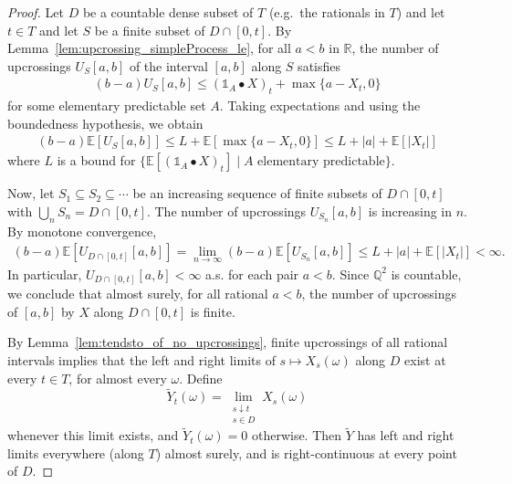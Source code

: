 \begin{proof}
  Let $D$ be a countable dense subset of $T$ (e.g.\ the rationals in $T$) and let $t \in T$ and let
  $S$ be a finite subset of $D \cap [0, t]$. By Lemma~\ref{lem:upcrossing_simpleProcess_le}, for all
  $a < b$ in $\mathbb{R}$, the number of upcrossings $U_S[a, b]$ of the interval $[a, b]$ along $S$
  satisfies
  \begin{align*}
    (b - a) U_S[a, b] \le (\mathbb{1}_A \bullet X)_t + \max\{a - X_t, 0\}
  \end{align*}
  for some elementary predictable set $A$.
  Taking expectations and using the boundedness hypothesis, we obtain
  \begin{align*}
    (b - a) \mathbb{E}[U_S[a, b]] \le L + \mathbb{E}[\max\{a - X_t, 0\}] \le L + |a| + \mathbb{E}[|X_t|]
  \end{align*}
  where $L$ is a bound for $\{\mathbb{E}[(\mathbb{1}_A \bullet X)_t] \mid A \text{ elementary predictable}\}$.

  Now, let $S_1 \subseteq S_2 \subseteq \cdots$ be an increasing sequence of finite subsets of
  $D \cap [0, t]$ with $\bigcup_n S_n = D \cap [0, t]$.
  The number of upcrossings $U_{S_n}[a, b]$ is increasing in $n$.
  By monotone convergence,
  \begin{align*}
    (b - a) \mathbb{E}[U_{D \cap [0, t]}[a, b]] = \lim_{n \to \infty} (b - a) \mathbb{E}[U_{S_n}[a, b]]
      \le L + |a| + \mathbb{E}[|X_t|] < \infty.
  \end{align*}
  In particular, $U_{D \cap [0, t]}[a, b] < \infty$ a.s. for each pair $a < b$.
  Since $\mathbb{Q}^2$ is countable, we conclude that almost surely, for all rational $a < b$, the
  number of upcrossings of $[a, b]$ by $X$ along $D \cap [0, t]$ is finite.

  By Lemma~\ref{lem:tendsto_of_no_upcrossings}, finite upcrossings of all rational intervals implies
  that the left and right limits of $s \mapsto X_s(\omega)$ along $D$ exist at every $t \in T$, for
  almost every $\omega$. Define
  $$\tilde{Y}_t(\omega) = \lim_{\substack{s \downarrow t \\ s \in D}} X_s(\omega)$$
  whenever this limit exists, and $\tilde{Y}_t(\omega) = 0$ otherwise.
  Then $\tilde{Y}$ has left and right limits everywhere (along $T$) almost surely, and is
  right-continuous at every point of $D$.


\end{proof}
